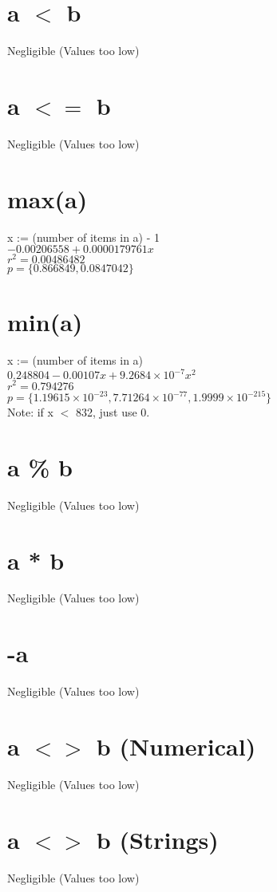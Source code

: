 \documentclass[12pt]{article}
\begin{document}
	\section{a $<$ b}
	Negligible (Values too low)
	
	\section{a $<=$ b}
	Negligible (Values too low)
	
	\section{max(a)} %
	x := (number of items in a) - 1\\
	$-0.00206558 + 0.0000179761 x$\\
	$r^2 = 0.00486482$\\
	$p = \{0.866849, 0.0847042\}$
	
	\section{min(a)}
	x := (number of items in a)\\
	$0.248804 - 0.00107 x + 9.2684 \times 10^{-7} x^2$\\
	$r^2 = 0.794276$\\
	$p = \{1.19615 \times 10^{-23}, 7.71264 \times 10^{-77}, 1.9999 \times 10^{-215}\}$\\
	Note: if x $<$ 832, just use 0.
	
	\section{a \% b}
	Negligible (Values too low)
	
	\section{a * b}
	Negligible (Values too low)
	
	\section{-a}
	Negligible (Values too low)
	
	\section{a $<>$ b (Numerical)}
	Negligible (Values too low)
	
	\section{a $<>$ b (Strings)}
	Negligible (Values too low)
	
\end{document}
